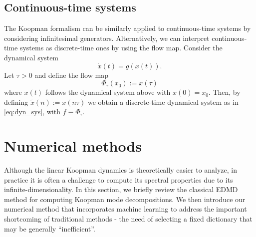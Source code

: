 \documentclass[%
 aip,
 cha,
 sd,%
 amsmath,amssymb,
 preprint,%
]{revtex4-1}
\begin{document}
\subsection{Continuous-time systems}
\label{sec:ctstime}
The Koopman formalism can be similarly applied to continuous-time systems by considering infinitesimal generators. Alternatively, we can interpret continuous-time systems as discrete-time ones by using the flow map. 
Consider the dynamical system
\[
\dot{x}(t) = g(x(t)).
\]
Let $\tau>0$ and define the flow map
\[
\Phi_\tau(x_0) := x(\tau)
\]
where $x(t)$ follows the dynamical system above with $x(0)=x_0$. Then, by defining $\tilde{x}(n):=x(n\tau)$ we obtain a discrete-time dynamical system as in \eqref{eq:dyn_sys}, with $f\equiv\Phi_\tau$. 

\section{Numerical methods}\label{sec:numerial method}
Although the linear Koopman dynamics is theoretically easier to analyze, in practice it is often a challenge to compute its spectral properties due to its infinite-dimensionality. In this section, we briefly review the classical EDMD method for computing Koopman mode decompositions. We then introduce our numerical method that incorporates machine learning to address the important shortcoming of traditional methods - the need of selecting a fixed dictionary that may be generally ``inefficient''. 
\end{document}
